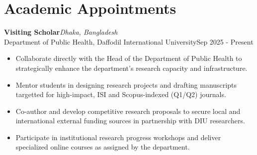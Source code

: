 \documentclass[
  11pt,
  letterpaper,
  DIV=11,
  numbers=noendperiod]{scrartcl}
\author{}
\date{}
\begin{document}
\par{}
\par{}
\vspace{-5pt}
\par{}
\vspace{-5pt}
\par{}
\vspace{-5pt}
\par{}
\vspace{-5pt}
\par{}
\vspace{-5pt}
\par{}
\vspace{-5pt}
\par{}

\vspace{-10pt}

\section{Academic Appointments}\label{academic-appointments}

\noindent

\begin{minipage}{\linewidth}
\textbf{Visiting Scholar}\hfill \textit{Dhaka, Bangladesh}\\
Department of Public Health, Daffodil International University\hfill Sep 2025 - Present
\end{minipage}
\begin{itemize}[nosep,topsep=2pt,leftmargin=1em]
  \item Collaborate directly with the Head of the Department of Public Health to strategically enhance the department's research capacity and infrastructure.
  \item Mentor students in designing research projects and drafting manuscripts targetted for high-impact, ISI and Scopus-indexed (Q1/Q2) journals.
  \item Co-author and develop competitive research proposals to secure local and international external funding sources in partnership with DIU researchers.
  \item Participate in institutional research progress workshops and deliver specialized online courses as assigned by the department.
\end{itemize}
\vspace{5pt}
\end{document}
